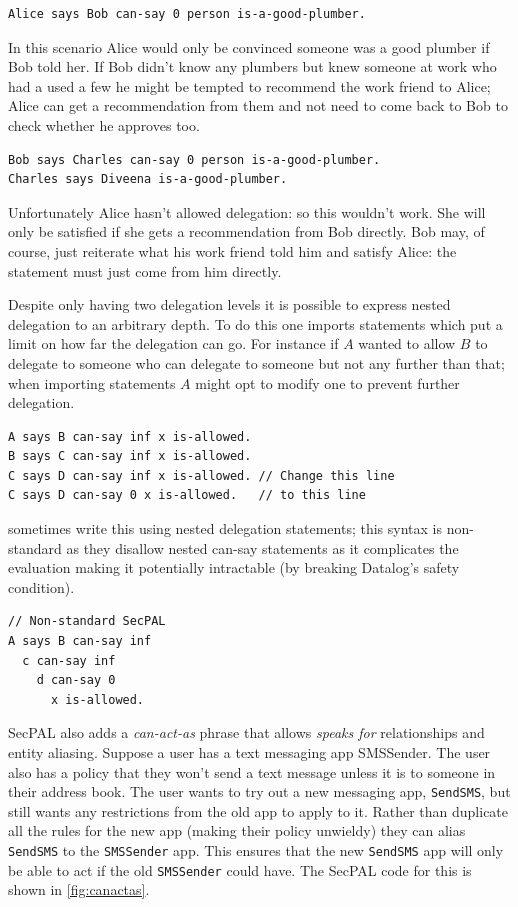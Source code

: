 \documentclass[a4paper,sfsidenotes]{%
  scrartcl%
}
\begin{document}
\begin{lstlisting}[language=SecPAL]
Alice says Bob can-say 0 person is-a-good-plumber.
\end{lstlisting}

In this scenario Alice would only be convinced someone was a good plumber if Bob
told her.  If Bob didn't know any plumbers but knew someone at work who had a
used a few he might be tempted to recommend the work friend to Alice; Alice can
get a recommendation from them and not need to come back to Bob to check whether
he approves too.

\begin{lstlisting}[language=SecPAL]
Bob says Charles can-say 0 person is-a-good-plumber.
Charles says Diveena is-a-good-plumber.
\end{lstlisting}

Unfortunately Alice hasn't allowed delegation: so this wouldn't work.  She will
only be satisfied if she gets a recommendation from Bob directly.  Bob may, of
course, just reiterate what his work friend told him and satisfy Alice: the
statement must just come from him directly.

Despite only having two delegation levels it is possible to express nested
delegation to an arbitrary depth.  To do this one imports statements which put a
limit on how far the delegation can go.  For instance if $A$ wanted to allow $B$
to delegate to someone who can delegate to someone but not any further than
that; when importing statements $A$ might opt to modify one to prevent further
delegation.

\begin{lstlisting}[language=SecPAL]
A says B can-say inf x is-allowed.
B says C can-say inf x is-allowed. 
C says D can-say inf x is-allowed. // Change this line
C says D can-say 0 x is-allowed.   // to this line
\end{lstlisting}

\citeauthor{Becker:2006vh} sometimes write this using nested delegation
statements; this syntax is non-standard as they disallow nested can-say
statements as it complicates the evaluation making it potentially intractable
(by breaking Datalog's safety condition).

\begin{lstlisting}[language=SecPAL]
// Non-standard SecPAL
A says B can-say inf 
  c can-say inf
    d can-say 0 
      x is-allowed.
\end{lstlisting}

{SecPAL} also adds a \emph{can-act-as} phrase that allows \emph{speaks for}
relationships and entity aliasing.  Suppose a user has a text messaging
app SMSSender.  The user also has a policy that they won't send a text message
unless it is to someone in their address book.  The user wants to try out a new
messaging app, \texttt{SendSMS}, but still wants any restrictions from the old
app to apply to it.  Rather than duplicate all the rules for the new app (making
their policy unwieldy) they can alias \texttt{SendSMS} to the \texttt{SMSSender}
app.  This ensures that the new \texttt{SendSMS} app will only be able to act if
the old \texttt{SMSSender} could have. The SecPAL code for this is shown in
\autoref{fig:canactas}.
\end{document}

